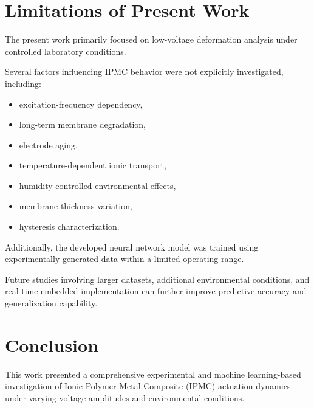 \documentclass[11pt,a4paper]{article}
\begin{document}

\section{Limitations of Present Work}

The present work primarily focused on low-voltage deformation analysis under controlled laboratory conditions.

Several factors influencing IPMC behavior were not explicitly investigated, including:

\begin{itemize}

\item excitation-frequency dependency,

\item long-term membrane degradation,

\item electrode aging,

\item temperature-dependent ionic transport,

\item humidity-controlled environmental effects,

\item membrane-thickness variation,

\item hysteresis characterization.

\end{itemize}

Additionally, the developed neural network model was trained using experimentally generated data within a limited operating range.

Future studies involving larger datasets, additional environmental conditions, and real-time embedded implementation can further improve predictive accuracy and generalization capability.


\section{Conclusion}

This work presented a comprehensive experimental and machine learning-based investigation of Ionic Polymer-Metal Composite (IPMC) actuation dynamics under varying voltage amplitudes and environmental conditions.
\end{document}
